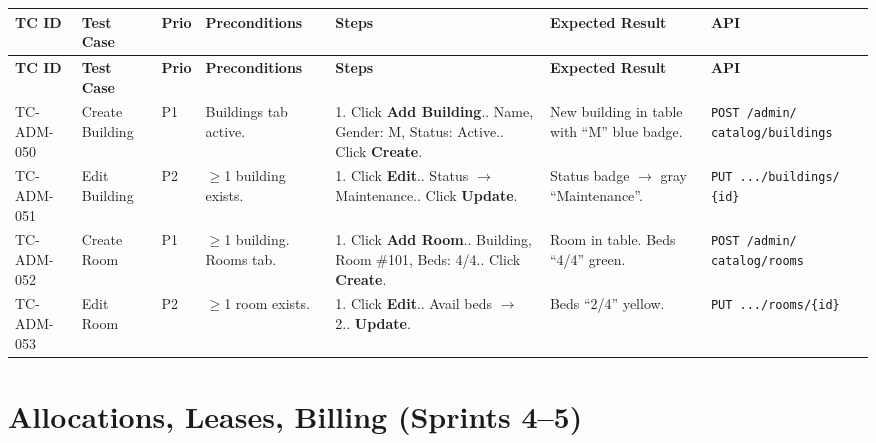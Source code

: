 \documentclass[12pt,a4paper]{article}
\begin{document}
\begin{longtable}{L{2cm} L{3cm} L{1cm} L{4cm} L{5.5cm} L{5.5cm} L{3cm}}
\toprule
\textbf{TC ID} & \textbf{Test Case} & \textbf{Prio} & \textbf{Preconditions} & \textbf{Steps} & \textbf{Expected Result} & \textbf{API} \\
\midrule
\endfirsthead \toprule \textbf{TC ID} & \textbf{Test Case} & \textbf{Prio} & \textbf{Preconditions} & \textbf{Steps} & \textbf{Expected Result} & \textbf{API} \\ \midrule \endhead \bottomrule \endfoot

TC-ADM-050 & Create Building & P1 & Buildings tab active. & 1. Click \textbf{Add Building}.. Name, Gender: M, Status: Active.. Click \textbf{Create}. & New building in table with ``M'' blue badge. & \texttt{POST /admin/ catalog/buildings} \\
\midrule
TC-ADM-051 & Edit Building & P2 & $\geq$1 building exists. & 1. Click \textbf{Edit}.. Status $\rightarrow$ Maintenance.. Click \textbf{Update}. & Status badge $\rightarrow$ gray ``Maintenance''. & \texttt{PUT .../buildings/ \{id\}} \\
\midrule
TC-ADM-052 & Create Room & P1 & $\geq$1 building. Rooms tab. & 1. Click \textbf{Add Room}.. Building, Room \#101, Beds: 4/4.. Click \textbf{Create}. & Room in table. Beds ``4/4'' green. & \texttt{POST /admin/ catalog/rooms} \\
\midrule
TC-ADM-053 & Edit Room & P2 & $\geq$1 room exists. & 1. Click \textbf{Edit}.. Avail beds $\rightarrow$ 2.. \textbf{Update}. & Beds ``2/4'' yellow. & \texttt{PUT .../rooms/\{id\}} \\
\end{longtable}

\section{Allocations, Leases, Billing (Sprints 4--5)}
\end{document}

